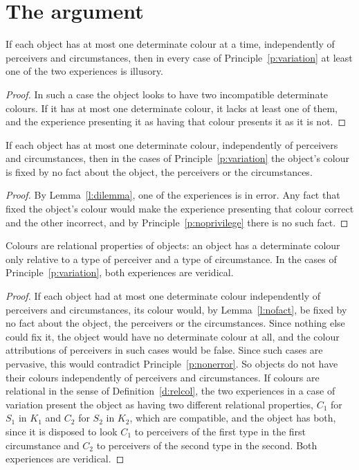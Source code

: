 \documentclass{situationist-preprint}
\begin{document}
\section{The argument}

\begin{lemma}\label{l:dilemma}
If each object has at most one determinate colour at a time, independently of perceivers and circumstances, then in every case of Principle~\ref{p:variation} at least one of the two experiences is illusory.
\end{lemma}

\begin{proof}
In such a case the object looks to have two incompatible determinate colours. If it has at most one determinate colour, it lacks at least one of them, and the experience presenting it as having that colour presents it as it is not.
\end{proof}

\begin{lemma}\label{l:nofact}
If each object has at most one determinate colour, independently of perceivers and circumstances, then in the cases of Principle~\ref{p:variation} the object's colour is fixed by no fact about the object, the perceivers or the circumstances.
\end{lemma}

\begin{proof}
By Lemma~\ref{l:dilemma}, one of the experiences is in error. Any fact that fixed the object's colour would make the experience presenting that colour correct and the other incorrect, and by Principle~\ref{p:noprivilege} there is no such fact.
\end{proof}

\begin{theorem}[Relationalism]\label{t:main}
Colours are relational properties of objects: an object has a determinate colour only relative to a type of perceiver and a type of circumstance. In the cases of Principle~\ref{p:variation}, both experiences are veridical.
\end{theorem}

\begin{proof}
If each object had at most one determinate colour independently of perceivers and circumstances, its colour would, by Lemma~\ref{l:nofact}, be fixed by no fact about the object, the perceivers or the circumstances. Since nothing else could fix it, the object would have no determinate colour at all, and the colour attributions of perceivers in such cases would be false. Since such cases are pervasive, this would contradict Principle~\ref{p:nonerror}. So objects do not have their colours independently of perceivers and circumstances. If colours are relational in the sense of Definition~\ref{d:relcol}, the two experiences in a case of variation present the object as having two different relational properties, $C_1$ for $S_1$ in $K_1$ and $C_2$ for $S_2$ in $K_2$, which are compatible, and the object has both, since it is disposed to look $C_1$ to perceivers of the first type in the first circumstance and $C_2$ to perceivers of the second type in the second. Both experiences are veridical.
\end{proof}
\end{document}
